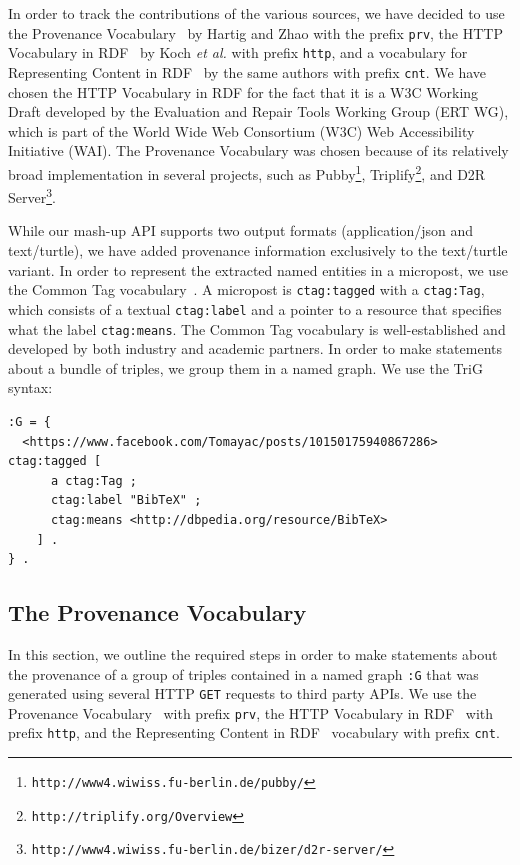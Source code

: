 \documentclass[twocolumn]{article}
\begin{document}
{In order to track the contributions of the various sources, we have decided to use the Provenance Vocabulary~\cite{Hartig:Provenance} by Hartig and Zhao with the prefix \texttt{prv}, the HTTP Vocabulary in RDF~\cite{HTTP:RDF} by Koch \emph{et al.} with prefix \texttt{http}, and a vocabulary for Representing Content in RDF~\cite{CNT:RDF} by the same authors with prefix \texttt{cnt}. We have chosen the HTTP Vocabulary in RDF for the fact that it is a W3C Working Draft  developed by the Evaluation and Repair Tools Working Group (ERT WG), which is part of the World Wide Web Consortium (W3C) Web Accessibility Initiative (WAI). The Provenance Vocabulary was chosen because of its relatively broad implementation in several projects, such as Pubby\footnote{\texttt{http://www4.wiwiss.fu-berlin.de/pubby/}}, Triplify\footnote{\texttt{http://triplify.org/Overview}}, and D2R Server\footnote{\texttt{http://www4.wiwiss.fu-berlin.de/bizer/d2r-server/}}.

While our mash-up API supports two output formats (application/json and text/turtle), we have added provenance information exclusively to the text/turtle variant. In order to represent the extracted named entities in a micropost, we use the Common Tag vocabulary~\cite{CommonTag:Spec}. A micropost is \texttt{ctag:tagged} with a \texttt{ctag:Tag}, which consists of a textual \texttt{ctag:label} and a pointer to a resource that specifies what the label \texttt{ctag:means}. The Common Tag vocabulary is well-established and developed by both industry and academic partners. In order to make statements about a bundle of triples, we group them in a named graph. We use the TriG~\cite{Bizer:TriG} syntax:
\vspace{2em}
\begin{lstlisting}
:G = {
  <https://www.facebook.com/Tomayac/posts/10150175940867286> ctag:tagged [
      a ctag:Tag ;
      ctag:label "BibTeX" ;
      ctag:means <http://dbpedia.org/resource/BibTeX>
    ] .
} .
\end{lstlisting}

\vspace{2em}

\subsection{The Provenance Vocabulary}                                      \label{sec:provenance}
In this section, we outline the required steps in order to make statements about the provenance of a group of triples contained in a named graph \texttt{:G} that was generated using several HTTP \texttt{GET} requests to third party APIs. We use the Provenance Vocabulary~\cite{Hartig:Provenance} with prefix \texttt{prv}, the HTTP Vocabulary in RDF~\cite{HTTP:RDF} with prefix \texttt{http}, and the Representing Content in RDF~\cite{CNT:RDF} vocabulary with prefix \texttt{cnt}.

}
\end{document}

